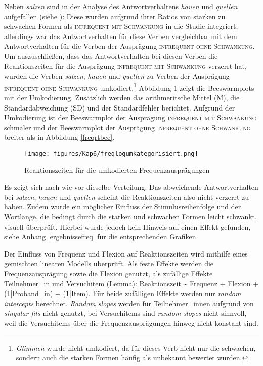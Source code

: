 \begin{sloppypar}
Neben \textit{salzen} sind in der Analyse des Antwortverhaltens \textit{hauen} und \textit{quellen} aufgefallen (siehe ): Diese wurden aufgrund ihrer Ratios von starken zu schwachen Formen als \textsc{infrequent mit Schwankung} in die Studie integriert, allerdings war das Antwortverhalten für diese Verben vergleichbar mit dem Antwortverhalten für die Verben der Ausprägung \textsc{infrequent ohne Schwankung}. Um auszuschließen, dass das Antwortverhalten bei diesen Verben die Reaktionszeiten für die Ausprägung \textsc{infrequent mit Schwankung} verzerrt hat, wurden die Verben \textit{salzen}, \textit{hauen} und \textit{quellen} zu Verben der Ausprägung \textsc{infrequent ohne Schwankung} umkodiert.\footnote{\textit{Glimmen} wurde nicht umkodiert, da für dieses Verb nicht nur die schwachen, sondern auch die starken Formen häufig als unbekannt bewertet wurden.} Abbildung \ref{freqrtumkat} zeigt die Beeswarmplots mit der Umkodierung. Zusätzlich werden das arithmeritsche Mittel (M), die Standardabweichung (SD) und der Standardfehler berichtet. Aufgrund der Umkodierung ist der Beeswarmplot der Ausprägung \textsc{infrequent mit Schwankung} schmaler und der Beeswarmplot der Ausprägung \textsc{infrequent ohne Schwankung} breiter als in Abbildung \ref{freqrtbee}.
\end{sloppypar}

\begin{figure}
\texttt{[image: figures/Kap6/freqlogumkategorisiert.png]} 
\caption{Reaktionszeiten für die umkodierten Frequenzausprägungen}
\label{freqrtumkat}
\end{figure}


Es zeigt sich nach wie vor dieselbe Verteilung. Das abweichende Antwortverhalten bei \textit{salzen}, \textit{hauen} und \textit{quellen} scheint die Reaktionszeiten also nicht verzerrt zu haben. Zudem wurde ein möglicher Einfluss der Stimulusreihenfolge und der Wortlänge, die bedingt durch die starken und schwachen Formen leicht schwankt, visuell überprüft. Hierbei wurde jedoch kein Hinweis auf einen Effekt gefunden, siehe Anhang \ref{ergebnissefreq} für die entsprechenden Grafiken.

Der Einfluss von Frequenz und Flexion auf Reaktionszeiten wird mithilfe eines gemischten linearen Modells überprüft. Als feste Effekte werden die Frequenzausprägung sowie die Flexion genutzt, als zufällige Effekte Teilnehmer\_in und Versuchitem (Lemma): Reaktionszeit \~{} Frequenz + Flexion + (1|Proband\_in) + (1|Item). Für beide zufälligen Effekte werden nur \textit{random intercepts} berechnet. \textit{Random slopes} werden für Teilnehmer\_innen aufgrund von \textit{singular fits} nicht genutzt, bei Versuchitems sind \textit{random slopes} nicht sinnvoll, weil die Versuchitems über die Frequenzausprägungen hinweg nicht konstant sind.



